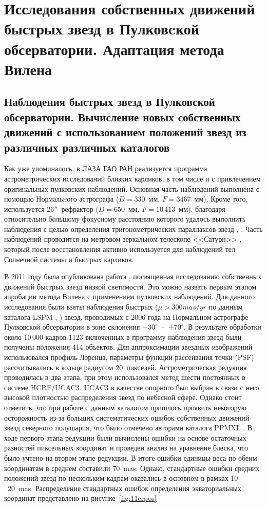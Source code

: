 \chapter{Исследования собственных движений быстрых звезд в Пулковcкой обсерватории. Адаптация метода Вилена} \label{ch:ch3}
\section{Наблюдения быстрых звезд в Пулковской обсерватории. Вычисление новых собственных движений с использованием положений звезд из различных различных каталогов} \label{sec:ch3/sect1}
Как уже упоминалось, в ЛАЗА ГАО РАН  реализуется программа астрометрических исследований близких карликов, в том числе и с привлечением оригинальных пулковских наблюдений. Основная часть наблюдений выполнена с помощью Нормального астрографа ($D=330$~мм, $F=3467$~мм).  Кроме того, используется  26$''$--рефрактор ($D=650$~мм, $F=10\,413$~мм), благодаря относительно большому фокусному расстоянию которого удалось выполнить наблюдения с целью определения тригонометрических параллаксов звезд \cite{2010AstL...36..576K}, \cite{2013MNRAS.435.1083K}. Часть наблюдений проводится на метровом зеркальном телескопе <<Сатурн>> \cite{2015arXiv151101642K}, который после восстановления активно используется для наблюдений тел Солнечной системы и быстрых карликов.

В 2011 году была опубликована работа \cite{2011AstL...37..420K}, посвященная исследованию собственных движений быстрых звезд низкой светимости. Это можно назвать первым этапом апробации метода Вилена с применением пулковских наблюдений. Для данного исследования были взяты наблюдения быстрых ($\mu>300 mas/yr$ по данным каталога LSPM \cite{2005AJ....129.1483L}, \cite{2008IAUS..248...74L}) звезд, проводимых с 2006 года на Нормальном астрографе Пулковской обсерватории в зоне склонения $+30^{\circ}$~--~$+70^{\circ}$. В результате обработки около 10\,000 кадров 1123 включенных в программу наблюдения звезд были получены положения 414 объектов. Для аппроксимации звездных изображений использовался профиль Лоренца, параметры функции рассеивания точки (PSF) рассчитывались в кольце радиусом 20~пикселей. Астрометрическая редукция проводилась в два этапа, при этом использовался метод шести постоянных в системе  HCRF/UCAC3. UCAC3 \cite{2010AJ....139.2184Z} в качестве опорного был выбран в связи с него высокой плотностью распределения звезд по небесной сфере. Однако стоит отметить, что при работе с данным каталогом пришлось проявить некоторую осторожность из-за больших систематических ошибок собственных движений звезд северного полушария, что было отмечено авторами  каталога PPMXL \cite{2010AJ....139.2440R}. В ходе первого этапа редукции были вычислены ошибки на основе остаточных разностей пиксельных координат и проведен анализ на уравнение блеска, что было учтено на втором этапе редукции. В итоге ошибки единицы веса по обеим координатам в среднем составили 70~mas. Однако, стандартные ошибки средних положений звезд по нескольким кадрам оказались в основном в рамках 10~--~20~mas. Распределение стандартных ошибок определения экваториальных координат представлено на рисунке~\ref{fig:11erpos}

